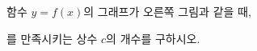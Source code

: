\noindent\begin{minipage}[t]{0.58\linewidth}\vspace{0pt}\raggedright 함수 $y=f(x)$의 그래프가 오른쪽 그림과 같을 때, \par\smallskip\end{minipage}\hfill\begin{minipage}[t]{0.4\linewidth}\vspace{0pt}\centering \resizebox{\ifdim\width>\linewidth\linewidth\else\width\fi}{!}{}\end{minipage}\par
\noindent {}\par\smallskip\noindent 를 만족시키는 상수 $c$의 개수를 구하시오. 

